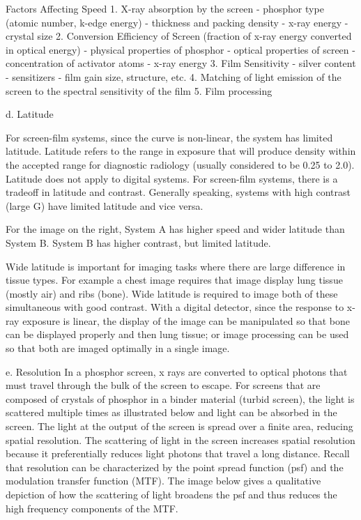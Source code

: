 \documentclass[mphy386-notes.tex]{subfiles}
\begin{document}
Factors Affecting Speed
1.  X-ray absorption by the screen
- phosphor type (atomic number, k-edge energy)
- thickness and packing density
- x-ray energy
- crystal size
2.  Conversion Efficiency of Screen (fraction of x-ray energy converted in optical energy)
- physical properties of phosphor
- optical properties of screen
- concentration of activator atoms
- x-ray energy
3.  Film Sensitivity
- silver content
- sensitizers
- film gain size, structure, etc.
4.  Matching of light emission of the screen to the spectral sensitivity of the film
5.  Film processing

d.	Latitude

For screen-film systems, since the curve is non-linear, the system has limited
latitude. Latitude refers to the range in exposure that will produce density
within the accepted range for diagnostic radiology (usually considered to be
0.25 to 2.0). Latitude does not apply to digital systems. For screen-film
systems, there is a tradeoff in latitude and contrast. Generally speaking,
systems with high contrast (large G) have limited latitude and vice versa.

For the image on the right, System A has higher speed and wider latitude than
System B. System B has higher contrast, but limited latitude.

Wide latitude is important for imaging tasks where there are large difference in
tissue types. For example a chest image requires that image display lung tissue
(mostly air) and ribs (bone). Wide latitude is required to image both of these
simultaneous with good contrast. With a digital detector, since the response to
x-ray exposure is linear, the display of the image can be manipulated so that
bone can be displayed properly and then lung tissue; or image processing can be
used so that both are imaged optimally in a single image.

e. Resolution In a phosphor screen, x rays are converted to optical photons that
must travel through the bulk of the screen to escape. For screens that are
composed of crystals of phosphor in a binder material (turbid screen), the light
is scattered multiple times as illustrated below and light can be absorbed in
the screen. The light at the output of the screen is spread over a finite area,
reducing spatial resolution. The scattering of light in the screen increases
spatial resolution because it preferentially reduces light photons that travel a
long distance. Recall that resolution can be characterized by the point spread
function (psf) and the modulation transfer function (MTF). The image below
gives a qualitative depiction of how the scattering of light broadens the psf
and thus reduces the high frequency components of the MTF.
\end{document}
